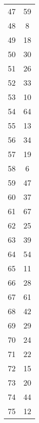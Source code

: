 \begin{table}
\begin{tabular}{c c }
47 & 59 \\
48 & 8 \\
49 & 18 \\
50 & 30 \\
51 & 26 \\
52 & 33 \\
53 & 10 \\
54 & 64 \\
55 & 13 \\
56 & 34 \\
57 & 19 \\
58 & 6 \\
59 & 47 \\
60 & 37 \\
61 & 67 \\
62 & 25 \\
63 & 39 \\
64 & 54 \\
65 & 11 \\
66 & 28 \\
67 & 61 \\
68 & 42 \\
69 & 29 \\
70 & 24 \\
71 & 22 \\
72 & 15 \\
73 & 20 \\
74 & 44 \\
75 & 12 \\
\hline
\end{tabular}
\end{table}